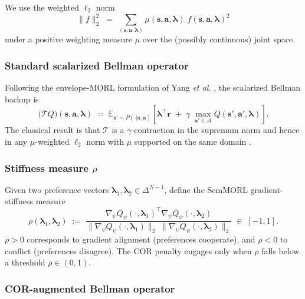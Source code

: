 We use the weighted $\ell_2$ norm
\begin{equation}
\label{eq:l2norm}
\|f\|_2^2 \;=\; \sum_{(\mathbf{s},\mathbf{a},\bm{\lambda})}
\mu(\mathbf{s},\mathbf{a},\bm{\lambda})\;
f(\mathbf{s},\mathbf{a},\bm{\lambda})^2
\end{equation}
under a positive weighting measure $\mu$ over the (possibly continuous)
joint space.

\subsubsection*{Standard scalarized Bellman operator}

Following the envelope-MORL formulation of Yang \emph{et al.}
\cite{yang2019envelope}, the scalarized Bellman backup is
\begin{equation}
\label{eq:Tstd}
\big(\mathcal{T}Q\big)(\mathbf{s},\mathbf{a},\bm{\lambda})
\;=\;
\mathbb{E}_{\mathbf{s}'\sim P(\cdot|\mathbf{s},\mathbf{a})}
\!\left[
\bm{\lambda}^\top \mathbf{r}
\;+\;
\gamma\;
\max_{\mathbf{a}'\in\mathcal{A}}
Q(\mathbf{s}',\mathbf{a}',\bm{\lambda})
\right].
\end{equation}
The classical result is that $\mathcal{T}$ is a $\gamma$-contraction in
the supremum norm and hence in any $\mu$-weighted $\ell_2$ norm with
$\mu$ supported on the same domain
\cite[Sec.~5]{bertsekas2019rl}.

\subsubsection*{Stiffness measure $\rho$}

Given two preference vectors $\bm{\lambda}_1,\bm{\lambda}_2\in
\Delta^{N-1}$, define the SemMORL gradient-stiffness measure
\begin{equation}
\label{eq:rho}
\rho(\bm{\lambda}_1,\bm{\lambda}_2)
\;:=\;
\frac{\nabla_\psi Q_\psi(\cdot,\bm{\lambda}_1)^\top
      \nabla_\psi Q_\psi(\cdot,\bm{\lambda}_2)}
     {\|\nabla_\psi Q_\psi(\cdot,\bm{\lambda}_1)\|_2\;
      \|\nabla_\psi Q_\psi(\cdot,\bm{\lambda}_2)\|_2}
\;\in\;[-1,1].
\end{equation}
$\rho>0$ corresponds to gradient alignment (preferences cooperate), and
$\rho<0$ to conflict (preferences disagree). The COR penalty engages
only when $\rho$ falls below a threshold $\bar{\rho}\in(0,1)$.

\subsubsection*{COR-augmented Bellman operator}


